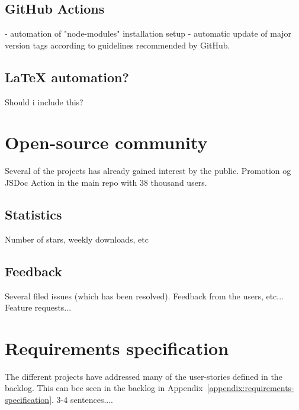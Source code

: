\subsection{GitHub Actions}
- automation of "node-modules" installation setup
- automatic update of major version tags according to guidelines recommended by GitHub.

\subsection{LaTeX automation?}
Should i include this?

\section{Open-source community}
Several of the projects has already gained interest by the public.
Promotion og JSDoc Action in the main repo with 38 thousand users.

\subsection{Statistics}
Number of stars, weekly downloads, etc
\subsection{Feedback}
Several filed issues (which has been resolved). Feedback from the users, etc... Feature requests...


\section{Requirements specification}
The different projects have addressed many of the user-stories defined in the backlog. This can bee seen in the backlog in Appendix~\ref{appendix:requirements-specification}. 3-4 sentences....